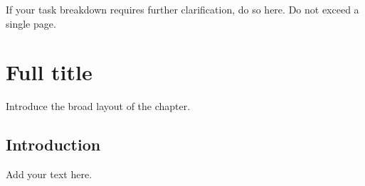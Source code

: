 If your task breakdown requires further clarification, do so here. Do not exceed a single page.


\chapter[Abbreviated title]{Full title}
\label{Chap:label}	%
\pagestyle{headings}


Introduce the broad layout of the chapter.



\section{Introduction}
\label{Sec:label}	%

Add your text here. 


